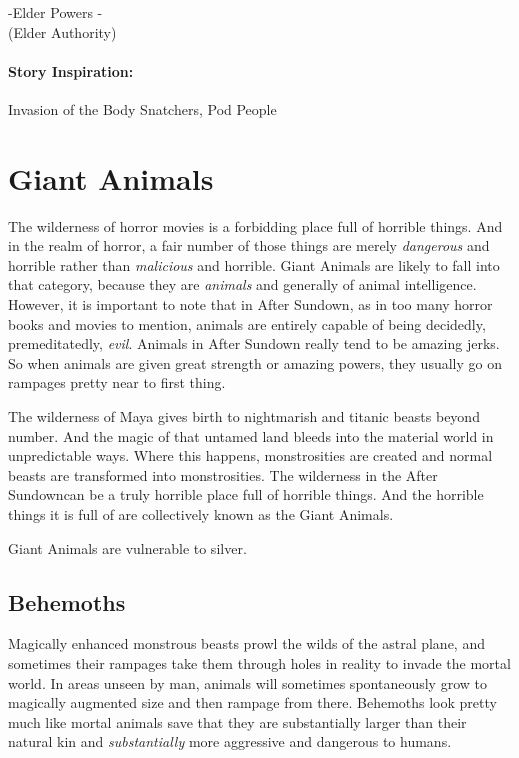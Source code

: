 -Elder Powers -\\
 (Elder Authority)

\paragraph{Story Inspiration:} Invasion of the Body Snatchers, Pod People

\section{Giant Animals} 

The wilderness of horror movies is a forbidding place full of horrible things. And in the realm of horror, a fair number of those things are merely \textit{dangerous} and horrible rather than \textit{malicious} and horrible. Giant Animals are likely to fall into that category, because they are \textit{animals} and generally of animal intelligence. However, it is important to note that in After Sundown, as in too many horror books and movies to mention, animals are entirely capable of being decidedly, premeditatedly, \textit{evil}. Animals in After Sundown really tend to be amazing jerks. So when animals are given great strength or amazing powers, they usually go on rampages pretty near to first thing. 

The wilderness of Maya gives birth to nightmarish and titanic beasts beyond number. And the magic of that untamed land bleeds into the material world in unpredictable ways. Where this happens, monstrosities are created and normal beasts are transformed into monstrosities. The wilderness in the After Sundowncan be a truly horrible place full of horrible things. And the horrible things it is full of are collectively known as the Giant Animals.

Giant Animals are vulnerable to silver.

\subsection{Behemoths} 

Magically enhanced monstrous beasts prowl the wilds of the astral plane, and sometimes their rampages take them through holes in reality to invade the mortal world. In areas unseen by man, animals will sometimes spontaneously grow to magically augmented size and then rampage from there. Behemoths look pretty much like mortal animals save that they are substantially larger than their natural kin and \textit{substantially} more aggressive and dangerous to humans.

